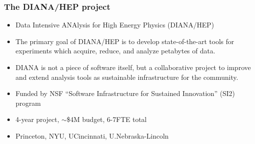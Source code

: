 \begin{frame}
\frametitle{The DIANA/HEP project}

\begin{itemize}
\item Data Intensive ANAlysis for High Energy Physics (DIANA/HEP)
\item The primary goal of DIANA/HEP is to develop state-of-the-art tools for experiments which acquire, reduce, and analyze petabytes of data.
\item DIANA is not a piece of software itself, but a collaborative project to improve and extend analysis tools as sustainable infrastructure for the community.
\item Funded by NSF ``Software Infrastructure for Sustained Innovation'' (SI2) program
\item 4-year project, $\sim$\$4M budget, 6-7FTE total
\item Princeton, NYU, UCincinnati, U.Nebraska-Lincoln
\end{itemize}

\end{frame}


